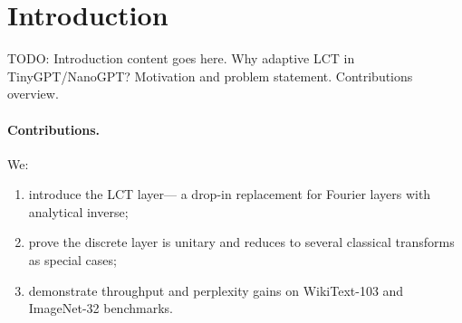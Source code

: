 \section{Introduction}
TODO: Introduction content goes here.
Why adaptive LCT in TinyGPT/NanoGPT?
Motivation and problem statement.
Contributions overview.

\paragraph{Contributions.}  We:
\begin{enumerate}
  \item introduce the \textsc{LCT} layer— a drop-in replacement for Fourier layers with analytical inverse;
  \item prove the discrete layer is unitary and reduces to several classical transforms as special cases;
  \item demonstrate throughput and perplexity gains on WikiText-103 and ImageNet-32 benchmarks.
\end{enumerate}